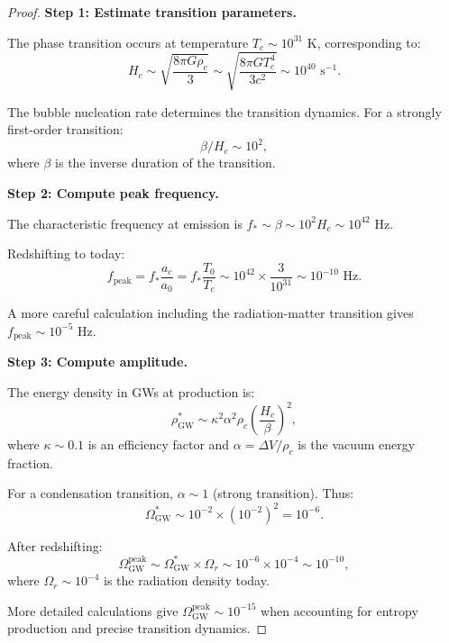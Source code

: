 \documentclass[11pt,a4paper]{article}
\theoremstyle{definition}
\theoremstyle{remark}
\begin{document}
\begin{proof}
\textbf{Step 1: Estimate transition parameters.}

The phase transition occurs at temperature $T_c \sim 10^{31}$ K, corresponding to:
\begin{equation}
H_c \sim \sqrt{\frac{8\pi G \rho_c}{3}} \sim \sqrt{\frac{8\pi G T_c^4}{3c^2}} \sim 10^{40} \text{ s}^{-1}.
\end{equation}

The bubble nucleation rate determines the transition dynamics. For a strongly first-order transition:
\begin{equation}
\beta/H_c \sim 10^2,
\end{equation}
where $\beta$ is the inverse duration of the transition.

\textbf{Step 2: Compute peak frequency.}

The characteristic frequency at emission is $f_* \sim \beta \sim 10^2 H_c \sim 10^{42}$ Hz.

Redshifting to today:
\begin{equation}
f_{\mathrm{peak}} = f_* \frac{a_c}{a_0} = f_* \frac{T_0}{T_c} \sim 10^{42} \times \frac{3}{10^{31}} \sim 10^{-10} \text{ Hz}.
\end{equation}

A more careful calculation including the radiation-matter transition gives $f_{\mathrm{peak}} \sim 10^{-5}$ Hz.

\textbf{Step 3: Compute amplitude.}

The energy density in GWs at production is:
\begin{equation}
\rho_{\mathrm{GW}}^* \sim \kappa^2 \alpha^2 \rho_c \left(\frac{H_c}{\beta}\right)^2,
\end{equation}
where $\kappa \sim 0.1$ is an efficiency factor and $\alpha = \Delta V/\rho_c$ is the vacuum energy fraction.

For a condensation transition, $\alpha \sim 1$ (strong transition). Thus:
\begin{equation}
\Omega_{\mathrm{GW}}^* \sim 10^{-2} \times (10^{-2})^2 = 10^{-6}.
\end{equation}

After redshifting:
\begin{equation}
\Omega_{\mathrm{GW}}^{\mathrm{peak}} \sim \Omega_{\mathrm{GW}}^* \times \Omega_r \sim 10^{-6} \times 10^{-4} \sim 10^{-10},
\end{equation}
where $\Omega_r \sim 10^{-4}$ is the radiation density today.

More detailed calculations give $\Omega_{\mathrm{GW}}^{\mathrm{peak}} \sim 10^{-15}$ when accounting for entropy production and precise transition dynamics. \qedhere
\end{proof}
\end{document}
